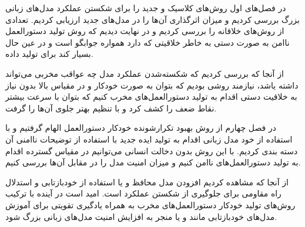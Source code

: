 

در فصل‌های اول روش‌های کلاسیک و جدید را برای شکستن عملکرد مدل‌های زبانی بزرگ بررسی کردیم و میزان اثرگذاری آن‌ها را در مدل‌های جدید ارزیابی کردیم.
تعدادی از روش‌های خلاقانه را بررسی کردیم و در نهایت دیدیم که روش تولید دستورالعمل ناامن به صورت دستی به خاطر خلاقیتی که دارد همواره جوابگو است و در عین حال بسیار کند برای تولید داده.

از آنجا که بررسی کردیم که شکسته‌شدن عملکرد مدل چه عواقب مخربی می‌تواند داشته یاشد، نیازمند روشی بودیم که بتوان به صورت خودکار و در مقیاس بالا بدون نیاز به خلاقیت دستی اقدام به تولید دستورالعمل‌های مخرب کنیم که بتوان با سرعت بیشتر نقاط ضعف را کشف کرد و با تنظیم بهتر جلوی آن‌ها را گرفت.

در فصل چهارم از روش بهبود تکرارشونده خودکار دستورالعمل الهام گرفتیم و با استفاده از خود مدل زبانی اقدام به تولید ایده جدید با استفاده از توضیحات ناامنی آن دسته بندی کردیم. با این روش بدون دخالت انسانی می‌توانیم در مقیاس گسترده اقدام به تولید دستورالعمل‌های ناامن کنیم و میزان امنیت مدل را در مقابل آن‌ها بررسی کنیم.

از آنجا که مشاهده کردیم افزودن مدل محافظ و یا استفاده از خودبازتابی و استدلال راه مقاومی برای جلوگیری از شکستن عملکرد است. امید است در آینده با ترکیب روش‌های تولید خودکار دستورالعمل‌های مخرب به همراه یادگیری تقویتی برای آموزش مدل‌های خودبازتابی مانند  و یا  منجر به افزایش امنیت مدل‌های زبانی بزرگ شود.
